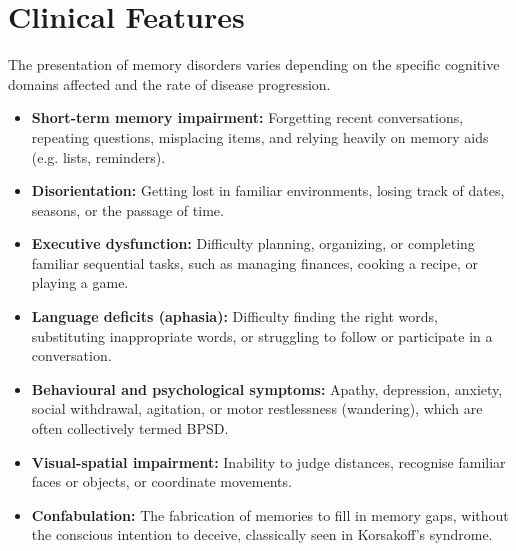 \section*{Clinical Features}
The presentation of memory disorders varies depending on the specific cognitive domains affected and the rate of disease progression.
\begin{itemize}
    \item \textbf{Short-term memory impairment:} Forgetting recent conversations, repeating questions, misplacing items, and relying heavily on memory aids (e.g. lists, reminders).
    \item \textbf{Disorientation:} Getting lost in familiar environments, losing track of dates, seasons, or the passage of time.
    \item \textbf{Executive dysfunction:} Difficulty planning, organizing, or completing familiar sequential tasks, such as managing finances, cooking a recipe, or playing a game.
    \item \textbf{Language deficits (aphasia):} Difficulty finding the right words, substituting inappropriate words, or struggling to follow or participate in a conversation.
    \item \textbf{Behavioural and psychological symptoms:} Apathy, depression, anxiety, social withdrawal, agitation, or motor restlessness (wandering), which are often collectively termed BPSD.
    \item \textbf{Visual-spatial impairment:} Inability to judge distances, recognise familiar faces or objects, or coordinate movements.
    \item \textbf{Confabulation:} The fabrication of memories to fill in memory gaps, without the conscious intention to deceive, classically seen in Korsakoff's syndrome.
\end{itemize}

